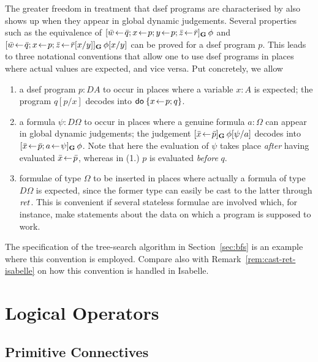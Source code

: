 The greater freedom in treatment that dsef programs are characterised by also
shows up when they appear in global dynamic judgements. Several properties such
as the equivalence of $\Gdj{\bar w\leteq \bar q; x\leteq p; y\leteq p; \bar
  z\leteq \bar r}\phi$ and $[\bar w\!\gets\! \bar q; x\!\gets\! p; \bar z\!\gets\! \bar
  r[x/y]]_\mathbf{G}\,\phi[x/y]$ can be proved for a dsef program $p$. This leads to three
notational conventions that allow one to use dsef programs in places where
actual values are expected, and vice versa.  Put concretely, we allow
\begin{enumerate}
\item a dsef program $p : DA$ to occur in places where a variable $x : A$ is
  expected; the program $q[p/x]$ decodes into $\mathsf{do}\: \{x\!\gets\! p; q\}$.
\item a formula $\psi : D\Omega$ to occur in places where a genuine formula $a: \Omega$ can
  appear in global dynamic judgements; the judgement $[\bar x\!\gets\! \bar
    p]_\mathbf{G}\,\phi[\psi/a]$ decodes into $[\bar x\!\gets\! \bar p; a\!\gets\! \psi]_\mathbf{G}\,\phi$. Note that
  here the evaluation of $\psi$ takes place \emph{after} having evaluated $\bar
  x\!\gets\! \bar p$, whereas in (1.) $p$ is evaluated \emph{before} $q$.
\item formulae of type $\Omega$ to be inserted in places where
  actually a formula of type $D\Omega$ is expected, since the former type can easily
  be cast to the latter through $\mathit{ret}$. This is convenient if several stateless
  formulae are involved which, for instance, make statements about the data on
  which a program is supposed to work. 
\end{enumerate}
The specification of the tree-search algorithm in Section~\ref{sec:bfs} is an
example where this convention is employed. Compare also with
Remark~\ref{rem:cast-ret-isabelle} on how this convention is handled in
Isabelle.

\section{Logical Operators}
\label{sec:logic-operators}


\subsection{Primitive Connectives}
\label{sec:prim-conn}

